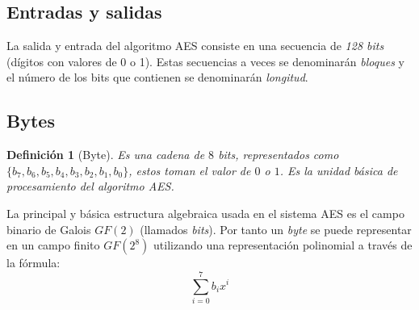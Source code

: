 \documentclass[peerreview]{IEEEtran}
\newtheorem{defin}{\textbf{Definición}}
\begin{document}
\subsection{Entradas y salidas}
La salida y entrada del algoritmo AES consiste en una secuencia de \textit{128
  bits} (dígitos con valores de 0 o 1). Estas secuencias a veces se denominarán
\textit{bloques} y el número de
los bits que contienen se denominarán \textit{longitud}.
\subsection{Bytes}
\begin{defin}[Byte]
  Es una cadena de $8$ \textit{bits}, representados como $\{b_7, b_6, b_5,
    b_4, b_3, b_2, b_1, b_0\}$, estos toman el valor de $0$ o $1$. Es la unidad
  básica de procesamiento del algoritmo AES.\\
\end{defin}

La principal y básica estructura algebraica usada en el sistema AES es el campo
binario de Galois $GF(2)$ (llamados \textit{bits}). Por tanto un \textit{byte}
se puede representar en un campo finito $GF(2^8)$ utilizando una representación
polinomial a través de la fórmula:
\[\sum_{i=0}^{7}b_{i}x^{i}\]
\end{document}

